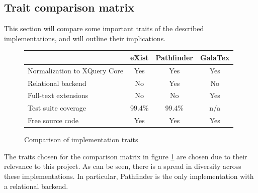 \subsection{Trait comparison matrix}
\label{sect:theory:existing_implementations:comparison}
This section will compare some important traits of the described
implementations, and will outline their implications.
\begin{figure}[!h]
	\centering
	\begin{tabular}{ | p{3cm} | c | c | c |}
	\hline
	& eXist & Pathfinder & GalaTex \\ \hline
	Normalization to XQuery Core & Yes & Yes & Yes \\ \hline
	Relational backend & No & Yes & No \\ \hline
	Full-text extensions & No & No & Yes \\ \hline
	Test suite coverage & 99.4\% & 99.4\% & n/a \\ \hline
	Free source code & Yes & Yes & Yes  \\
	\hline
	\end{tabular}
	\caption{Comparison of implementation traits}
	\label{figure:comparison_matrix}
\end{figure}
The traits chosen for the comparison matrix in figure
\ref{figure:comparison_matrix} are chosen due to their relevance to this
project. As can be seen, there is a spread in diversity across these
implementations. In particular, Pathfinder is the only implementation with a
relational backend.